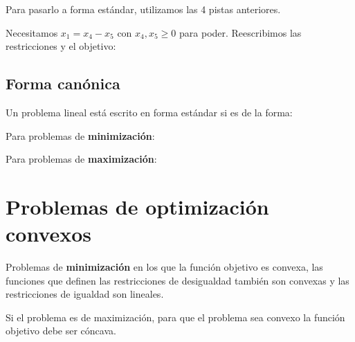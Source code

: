 \begin{example}
\begin{ioprob}
\end{ioprob}

Para pasarlo a forma estándar, utilizamos las 4 pistas anteriores. 

Necesitamos $x_1 = x_4 - x_5$ con $x_4,x_5\geq 0$ para poder. Reescribimos las restricciones y el objetivo:

\begin{ioprob}
\end{ioprob}

\end{example}


\subsection{Forma canónica}

\begin{defn}
Un problema lineal está escrito en forma estándar si es de la forma:


Para problemas de \textbf{minimización}:

\begin{ioprob}
\end{ioprob}


 
Para problemas de \textbf{maximización}:

\begin{ioprob}
\end{ioprob}

\end{defn}


\section{Problemas de optimización convexos}

\begin{defn}
\label{defn:problema_convexo}
Problemas de \textbf{minimización} en los que la función objetivo es convexa, las funciones que definen las restricciones de desigualdad también son convexas y las restricciones de igualdad son lineales. 

Si el problema es de maximización, para que el problema sea convexo la función objetivo debe ser cóncava.
\end{defn}

